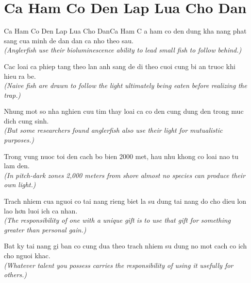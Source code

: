 \section{Ca Ham Co Den Lap Lua Cho Dan}
\begin{truyen}{Ca Ham Co Den Lap Lua Cho Dan}{Ca Ham}
C a ham co den dung kha nang phat sang cua minh de dan dan ca nho theo sau.\\
\textit{(Anglerfish use their bioluminescence ability to lead small fish to follow behind.)}

Cac loai ca phiep tang theo lan anh sang de di theo cuoi cung bi an truoc khi hieu ra be.\\
\textit{(Naive fish are drawn to follow the light ultimately being eaten before realizing the trap.)}

Nhung mot so nha nghien cuu tim thay loai ca co den cung dung den trong muc dich cung sinh.\\
\textit{(But some researchers found anglerfish also use their light for mutualistic purposes.)}

Trong vung nuoc toi den cach bo bien 2000 met, hau nhu khong co loai nao tu lam den.\\
\textit{(In pitch-dark zones 2,000 meters from shore almost no species can produce their own light.)}

Trach nhiem cua nguoi co tai nang rieng biet la su dung tai nang do cho dieu lon lao hơn luoi ich ca nhan.\\
\textit{(The responsibility of one with a unique gift is to use that gift for something greater than personal gain.)}

\end{truyen}
\begin{baihoc}
  Bat ky tai nang gi ban co cung dua theo trach nhiem su dung no mot cach co ich cho nguoi khac.\\
  \textit{(Whatever talent you possess carries the responsibility of using it usefully for others.)}
\end{baihoc}

